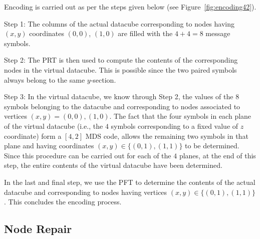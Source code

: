 \begin{multicols}{2}
 Encoding is carried out as per the steps given below (see Figure~\ref{fig:encoding42}).
 \bit
 \item Step 1: The columns of the actual datacube corresponding to nodes having $(x,y)$ coordinates $(0,0)$, $(1,0)$ are filled with the $4+4=8$ message symbols.  
 \item Step 2: The PRT is then used to compute the contents of the corresponding nodes in the virtual datacube. This is possible since the two paired symbols always belong to the same $y$-section. 
 \item Step 3: In the virtual datacube, we know through Step 2, the values of the $8$ symbols belonging to the datacube and corresponding to nodes associated to vertices $(x,y)=(0,0),(1,0)$. The fact that the four symbols in each plane of the virtual datacube (i.e., the $4$ symbols corresponding to a fixed value of $z$ coordinate) form a $[4,2]$ MDS code, allows the remaining two symbols in that plane and having coordinates $(x,y) \in \{(0,1),(1,1)\}$ to be determined. 	Since this procedure can be carried out for each of the $4$ planes, at the end of this step, the entire contents of the virtual datacube have been determined. 
 \item In the last and final step, we use the PFT to determine the contents of the actual datacube and corresponding to nodes having vertices $(x,y) \in \{(0,1),(1,1)\}$.  This concludes the encoding process. 
 \eit

 \subsection{Node Repair}

\vskip -3pt


\end{multicols}
